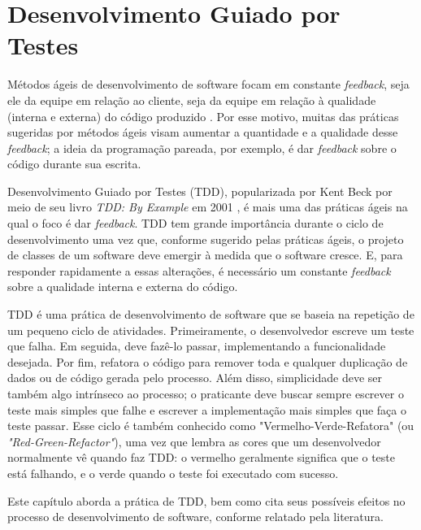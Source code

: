 \chapter{Desenvolvimento Guiado por Testes}
\label{cap:tdd}

Métodos ágeis de desenvolvimento de software focam em constante
\textit{feedback}, seja ele da equipe em relação ao cliente, seja da equipe em relação à
qualidade (interna e externa) do código produzido \cite{AgileManifesto}. Por
esse motivo, muitas das práticas sugeridas por métodos ágeis visam aumentar a 
quantidade e a qualidade desse \textit{feedback}; a ideia da programação pareada, por
exemplo, é dar \textit{feedback} sobre o código durante sua escrita.

Desenvolvimento Guiado por Testes (TDD), popularizada por Kent Beck por meio de seu livro
\textit{TDD: By Example} em 2001 \cite{TDDByExample}, é mais uma das práticas
ágeis na qual o foco é dar \textit{feedback}. TDD tem grande importância durante o ciclo
de desenvolvimento uma vez que, conforme sugerido pelas práticas ágeis, o projeto de classes de um
software deve emergir à medida que o software cresce. E, para responder
rapidamente a essas alterações, é necessário um constante \textit{feedback} sobre a
qualidade interna e externa do código.

TDD é uma prática de desenvolvimento de software que se baseia na repetição de
um pequeno ciclo de atividades. Primeiramente, o desenvolvedor escreve um
teste que falha. Em seguida, deve fazê-lo passar, implementando a
funcionalidade desejada. Por fim, refatora o código para remover toda e qualquer
duplicação de dados ou de código gerada pelo processo.
Além disso, simplicidade deve ser também algo intrínseco ao processo; o praticante
deve buscar sempre escrever o teste mais simples que falhe e escrever a implementação mais simples
que faça o teste passar.
Esse ciclo
é também conhecido como 
"Vermelho-Verde-Refatora" (ou \textit{"Red-Green-Refactor"}), uma vez que lembra as cores que um 
desenvolvedor normalmente vê quando faz TDD: o vermelho geralmente significa que
o teste está falhando, e o verde quando o teste foi executado com sucesso.

Este capítulo aborda a prática de TDD, bem como cita
seus possíveis efeitos no processo de desenvolvimento de software, conforme relatado pela
literatura.

